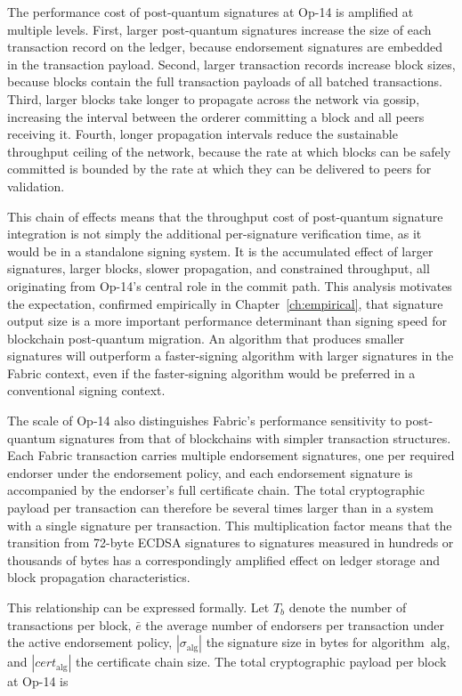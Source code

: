 \documentclass[conference]{IEEEtran}
\begin{document}
The performance cost of post-quantum signatures at Op-14 is amplified at
multiple levels. First, larger post-quantum signatures increase the size of
each transaction record on the ledger, because endorsement signatures are
embedded in the transaction payload. Second, larger transaction records
increase block sizes, because blocks contain the full transaction payloads
of all batched transactions. Third, larger blocks take longer to propagate
across the network via gossip, increasing the interval between the orderer
committing a block and all peers receiving it. Fourth, longer propagation
intervals reduce the sustainable throughput ceiling of the network, because
the rate at which blocks can be safely committed is bounded by the rate at
which they can be delivered to peers for validation.

This chain of effects means that the throughput cost of post-quantum
signature integration is not simply the additional per-signature verification
time, as it would be in a standalone signing system. It is the accumulated
effect of larger signatures, larger blocks, slower propagation, and
constrained throughput, all originating from Op-14's central role in the
commit path. This analysis motivates the expectation, confirmed empirically
in Chapter~\ref{ch:empirical}, that signature output size is a more
important performance determinant than signing speed for blockchain
post-quantum migration. An algorithm that produces smaller signatures will
outperform a faster-signing algorithm with larger signatures in the Fabric
context, even if the faster-signing algorithm would be preferred in a
conventional signing context.

The scale of Op-14 also distinguishes Fabric's performance sensitivity
to post-quantum signatures from that of blockchains with simpler transaction
structures. Each Fabric transaction carries multiple endorsement signatures,
one per required endorser under the endorsement policy, and each endorsement
signature is accompanied by the endorser's full certificate chain. The total
cryptographic payload per transaction can therefore be several times larger
than in a system with a single signature per transaction. This multiplication
factor means that the transition from 72-byte ECDSA signatures to signatures
measured in hundreds or thousands of bytes has a correspondingly amplified
effect on ledger storage and block propagation characteristics.

This relationship can be expressed formally. Let $T_b$ denote the number of
transactions per block, $\bar{e}$ the average number of endorsers per
transaction under the active endorsement policy, $|\sigma_{\mathrm{alg}}|$
the signature size in bytes for algorithm~$\mathrm{alg}$, and
$|\mathit{cert}_{\mathrm{alg}}|$ the certificate chain size. The total
cryptographic payload per block at Op-14 is
\end{document}
